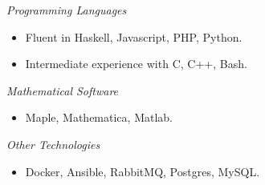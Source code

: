 \documentclass[11pt,article,oneside]{memoir}
\begin{document}
\bigskip



\ind \emph{Programming Languages}
\small
\begin{itemize}
  \item Fluent in Haskell, Javascript, PHP, Python.
  \item Intermediate experience with C,  C++, Bash.
\end{itemize}
\normalsize

\ind \emph{Mathematical Software}
\small
\begin{itemize}
  \item Maple, Mathematica, Matlab.
\end{itemize}
\normalsize

\ind \emph{Other Technologies}
\small
\begin{itemize}
  \item Docker, Ansible, RabbitMQ, Postgres, MySQL.
\end{itemize}
\normalsize
\end{document}
